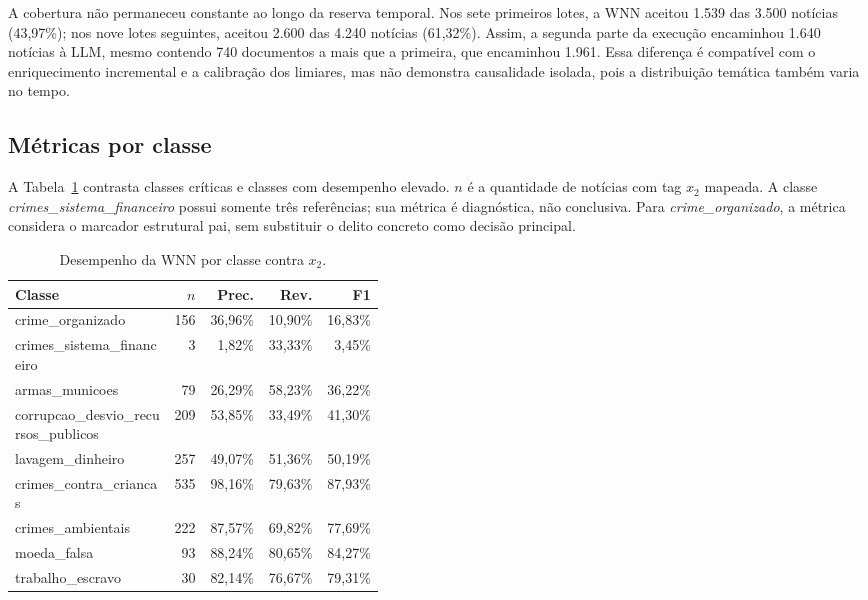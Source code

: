 A cobertura não permaneceu constante ao longo da reserva temporal. Nos sete primeiros lotes, a WNN aceitou 1.539 das 3.500 notícias (43,97\%); nos nove lotes seguintes, aceitou 2.600 das 4.240 notícias (61,32\%). Assim, a segunda parte da execução encaminhou 1.640 notícias à LLM, mesmo contendo 740 documentos a mais que a primeira, que encaminhou 1.961. Essa diferença é compatível com o enriquecimento incremental e a calibração dos limiares, mas não demonstra causalidade isolada, pois a distribuição temática também varia no tempo.

\subsection{Métricas por classe}

A Tabela~\ref{tab:metricas-classe} contrasta classes críticas e classes com desempenho elevado. $n$ é a quantidade de notícias com tag $x_2$ mapeada. A classe \textit{crimes\_sistema\_financeiro} possui somente três referências; sua métrica é diagnóstica, não conclusiva. Para \textit{crime\_organizado}, a métrica considera o marcador estrutural pai, sem substituir o delito concreto como decisão principal.

\begin{table}[ht]
\centering
\caption{Desempenho da WNN por classe contra $x_2$.}
\label{tab:metricas-classe}
\scriptsize
\begin{tabular}{p{0.43\linewidth}rrrr}
\hline
\textbf{Classe} & \textbf{$n$} & \textbf{Prec.} & \textbf{Rev.} & \textbf{F1} \\
\hline
crime\_organizado & 156 & 36,96\% & 10,90\% & 16,83\% \\
crimes\_sistema\_financeiro & 3 & 1,82\% & 33,33\% & 3,45\% \\
armas\_municoes & 79 & 26,29\% & 58,23\% & 36,22\% \\
corrupcao\_desvio\_recursos\_publicos & 209 & 53,85\% & 33,49\% & 41,30\% \\
lavagem\_dinheiro & 257 & 49,07\% & 51,36\% & 50,19\% \\
crimes\_contra\_criancas & 535 & 98,16\% & 79,63\% & 87,93\% \\
crimes\_ambientais & 222 & 87,57\% & 69,82\% & 77,69\% \\
moeda\_falsa & 93 & 88,24\% & 80,65\% & 84,27\% \\
trabalho\_escravo & 30 & 82,14\% & 76,67\% & 79,31\% \\
\hline
\end{tabular}
\end{table}


